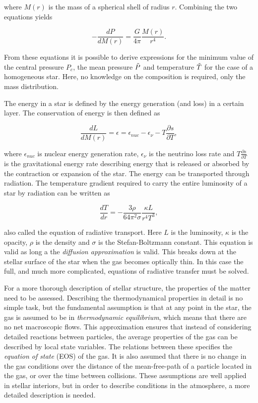 \noindent where $M(r)$ is the mass of a spherical shell of  radius $r$. Combining the two equations yields

\begin{equation}
    -\frac{dP}{dM(r)} = \frac{G}{4\pi}\frac{M(r)}{r^4}.
    \end{equation}

\noindent From these equations it is possible to derive expressions for the minimum value of the central pressure $P_c$, the mean pressure $\Tilde{P}$ and temperature $\Tilde{T}$ for the case of a homogeneous star. Here, no knowledge on the composition is required, only the mass distribution.

The energy in a star is defined by the energy generation (and loss)  in a certain layer. The conservation of energy is then defined as

\begin{equation}
     \frac{dL}{dM(r)} = \epsilon = \epsilon_{nuc} - \epsilon_{\nu} - T\frac{\partial s}{\partial T},
\end{equation} 

\noindent where $\epsilon_{nuc}$ is nuclear energy generation rate, $\epsilon_{\nu}$ is the neutrino loss rate and $T\frac{\partial s}{\partial T}$ is the gravitational energy rate describing energy that is released or absorbed by the contraction or expansion of the star. The energy can be transported through radiation. The temperature gradient required to carry the entire luminosity of a star by radiation can be written as 

\begin{equation}
\label{transportradiative}
	\frac{dT}{dr} = -\frac{3 \rho}{64\pi^2 \sigma }\frac{\kappa L}{r^4 T^3},
\end{equation}

\noindent also called the equation of radiative transport. Here $L$ is the luminosity, $\kappa$ is the opacity, $\rho$ is the density and $\sigma$ is the Stefan-Boltzmann constant. This equation is valid as long a the \textit{diffusion approximation} is valid. This breaks down at the stellar surface of the star when the gas becomes optically thin. In this case the full, and much more complicated, equations of radiative transfer must be solved.

For a more thorough description of stellar structure, the properties of the matter need to be assessed. Describing the thermodynamical properties in detail is no simple task, but the fundamental assumption is that at any point in the star, the gas is assumed to be in \textit{thermodynamic equilibrium}, which means that there are no net macroscopic flows. This approximation ensures that instead of considering detailed reactions between particles, the average properties of the gas can be described by local state variables. The relations between these specifies the \textit{equation of state} (EOS) of the gas. It is also assumed that there is no change in the gas conditions over the distance of the mean-free-path of a particle located in the gas, or over the time between collisions. These assumptions are well applied in stellar interiors, but in order to describe conditions in the atmosphere, a more detailed description is needed. 

